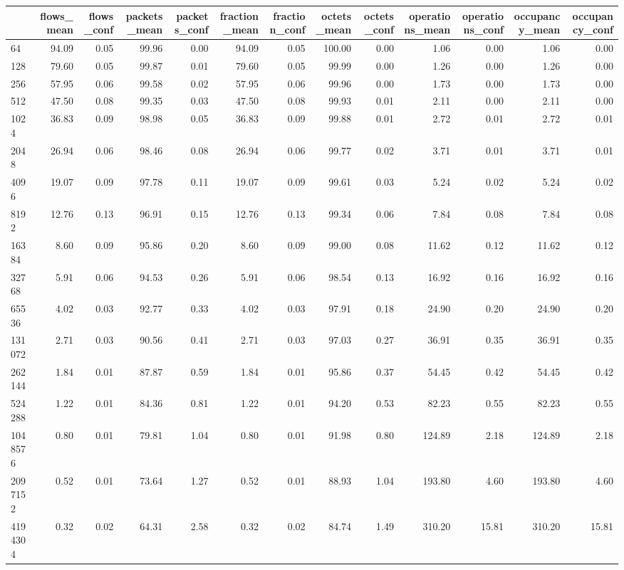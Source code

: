 \begin{tabular}{lrrrrrrrrrrrr}
\toprule
 & flows_mean & flows_conf & packets_mean & packets_conf & fraction_mean & fraction_conf & octets_mean & octets_conf & operations_mean & operations_conf & occupancy_mean & occupancy_conf \\
\midrule
64 & 94.09 & 0.05 & 99.96 & 0.00 & 94.09 & 0.05 & 100.00 & 0.00 & 1.06 & 0.00 & 1.06 & 0.00 \\
128 & 79.60 & 0.05 & 99.87 & 0.01 & 79.60 & 0.05 & 99.99 & 0.00 & 1.26 & 0.00 & 1.26 & 0.00 \\
256 & 57.95 & 0.06 & 99.58 & 0.02 & 57.95 & 0.06 & 99.96 & 0.00 & 1.73 & 0.00 & 1.73 & 0.00 \\
512 & 47.50 & 0.08 & 99.35 & 0.03 & 47.50 & 0.08 & 99.93 & 0.01 & 2.11 & 0.00 & 2.11 & 0.00 \\
1024 & 36.83 & 0.09 & 98.98 & 0.05 & 36.83 & 0.09 & 99.88 & 0.01 & 2.72 & 0.01 & 2.72 & 0.01 \\
2048 & 26.94 & 0.06 & 98.46 & 0.08 & 26.94 & 0.06 & 99.77 & 0.02 & 3.71 & 0.01 & 3.71 & 0.01 \\
4096 & 19.07 & 0.09 & 97.78 & 0.11 & 19.07 & 0.09 & 99.61 & 0.03 & 5.24 & 0.02 & 5.24 & 0.02 \\
8192 & 12.76 & 0.13 & 96.91 & 0.15 & 12.76 & 0.13 & 99.34 & 0.06 & 7.84 & 0.08 & 7.84 & 0.08 \\
16384 & 8.60 & 0.09 & 95.86 & 0.20 & 8.60 & 0.09 & 99.00 & 0.08 & 11.62 & 0.12 & 11.62 & 0.12 \\
32768 & 5.91 & 0.06 & 94.53 & 0.26 & 5.91 & 0.06 & 98.54 & 0.13 & 16.92 & 0.16 & 16.92 & 0.16 \\
65536 & 4.02 & 0.03 & 92.77 & 0.33 & 4.02 & 0.03 & 97.91 & 0.18 & 24.90 & 0.20 & 24.90 & 0.20 \\
131072 & 2.71 & 0.03 & 90.56 & 0.41 & 2.71 & 0.03 & 97.03 & 0.27 & 36.91 & 0.35 & 36.91 & 0.35 \\
262144 & 1.84 & 0.01 & 87.87 & 0.59 & 1.84 & 0.01 & 95.86 & 0.37 & 54.45 & 0.42 & 54.45 & 0.42 \\
524288 & 1.22 & 0.01 & 84.36 & 0.81 & 1.22 & 0.01 & 94.20 & 0.53 & 82.23 & 0.55 & 82.23 & 0.55 \\
1048576 & 0.80 & 0.01 & 79.81 & 1.04 & 0.80 & 0.01 & 91.98 & 0.80 & 124.89 & 2.18 & 124.89 & 2.18 \\
2097152 & 0.52 & 0.01 & 73.64 & 1.27 & 0.52 & 0.01 & 88.93 & 1.04 & 193.80 & 4.60 & 193.80 & 4.60 \\
4194304 & 0.32 & 0.02 & 64.31 & 2.58 & 0.32 & 0.02 & 84.74 & 1.49 & 310.20 & 15.81 & 310.20 & 15.81 \\

\end{tabular}
